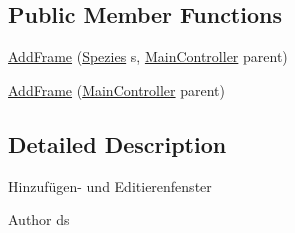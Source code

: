 \subsection*{Public Member Functions}
\begin{DoxyCompactItemize}
\item 
\hyperlink{classde_1_1gameoflife_1_1gui_1_1AddFrame_a3e871234db221abec1eaa7b718bc52f1}{Add\-Frame} (\hyperlink{classde_1_1gameoflife_1_1models_1_1Spezies}{Spezies} s, \hyperlink{classde_1_1gameoflife_1_1controllers_1_1MainController}{Main\-Controller} parent)
\item 
\hyperlink{classde_1_1gameoflife_1_1gui_1_1AddFrame_a911af50f3f2a99d697f4647137ed2b6d}{Add\-Frame} (\hyperlink{classde_1_1gameoflife_1_1controllers_1_1MainController}{Main\-Controller} parent)
\end{DoxyCompactItemize}


\subsection{Detailed Description}
Hinzufügen-\/ und Editierenfenster \begin{DoxyAuthor}{Author}
ds 
\end{DoxyAuthor}


